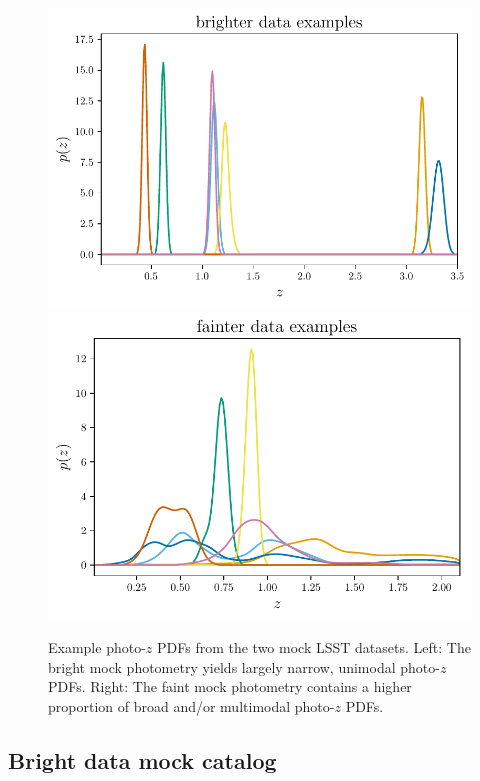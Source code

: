 \documentclass[\docopts]{\docclass}
\newcommand{\pz}{photo-$z$ PDF}
\newcommand{\mgdata}{bright\xspace}
\newcommand{\Mgdata}{Bright\xspace}
\newcommand{\ssdata}{faint\xspace}
\begin{document}
\begin{figure}
  \begin{center}
    \includegraphics[width=\columnwidth]{figures/graham_pzs.pdf}
    \includegraphics[width=\columnwidth]{figures/schmidt_pzs.pdf}
    \caption{
    Example \pz s from the two mock LSST datasets.
    Left: The \mgdata mock photometry yields largely narrow, unimodal \pz s.
    Right: The \ssdata mock photometry contains a higher proportion of broad 
and/or multimodal \pz s.
    \label{fig:example_pzs}}
  \end{center}
\end{figure}

\subsection{\Mgdata data mock catalog}
\label{sec:graham}
\end{document}
